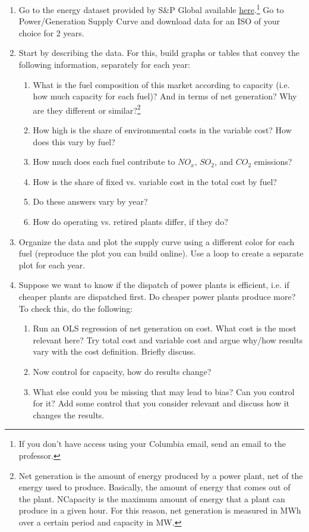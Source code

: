 \documentclass[12pt]{article}
\begin{document}
 
\begin{enumerate}
	
	\item Go to the energy dataset provided by S\&P Global available \href{https://platform.mi.spglobal.com/web/client?auth=inherit#news/home}{here}.\footnote{If you don't have access using your Columbia email, send an email to the professor.} Go to Power/Generation Supply Curve and download data for an ISO of your choice for 2 years.
	\item Start by describing the data. For this, build graphs or tables that convey the following information, separately for each year:
		\begin{enumerate}
		\item 	What is the fuel composition of this market according to capacity (i.e. how much capacity for each fuel)? And in terms of net generation? Why are they different or similar?\footnote{Net generation is the amount of energy produced by a power plant, net of the energy used to produce. Basically, the amount of energy that comes out of the plant. NCapacity is the maximum amount of energy  that a plant can produce in a given hour. For this reason, net generation is measured in MWh over a certain period and capacity in MW.}
		\item How high is the share of environmental costs in the variable cost? How does this vary by fuel? 
		\item How much does each fuel contribute to $NO_x$, $SO_2$, and $CO_2$ emissions?
		\item How is the share of fixed vs. variable cost in the total cost by fuel?
		\item Do these answers vary by year?
		\item How do operating vs. retired plants differ, if they do?
		\end{enumerate}

	\item Organize the data and plot the supply curve using a different color for each fuel (reproduce the plot you can build online). Use a loop to create a separate plot for each year.
	\item Suppose we want to know if the dispatch of power plants is efficient, i.e. if cheaper plants are dispatched first. Do cheaper power plants produce more? To check this, do the following:
		\begin{enumerate}
		\item Run an OLS regression of net generation on cost. What cost is the most relevant here? Try total cost and variable cost and argue why/how results vary with the cost definition. Briefly discuss.
		\item Now control for capacity, how do results change?
		\item What else could you be missing that may lead to bias? Can you control for it?	Add some control that you consider relevant and discuss how it changes the results. 
		\end{enumerate}

\end{enumerate}
\end{document}
